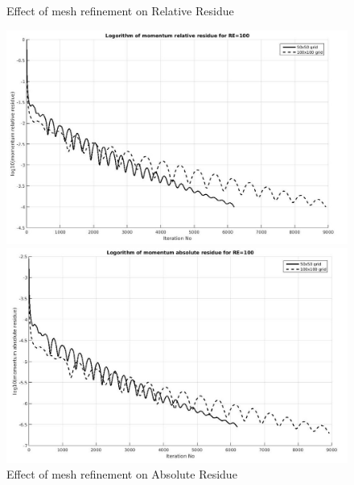 \documentclass[12pt]{elsarticle}
\begin{document}
	\begin{figure}[h]
		\caption{Effect of mesh refinement on Relative Residue}
		\centering\includegraphics[width=1.0\linewidth]{13rr_mesh_comparision}
		\caption{Effect of mesh refinement on Absolute Residue}
		\centering\includegraphics[width=1.0\linewidth]{14_ar_mesh_comparision}
	\end{figure}
	
\end{document}
